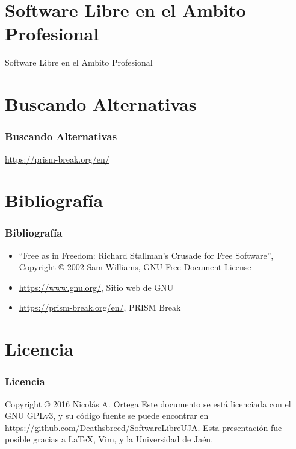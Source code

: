 \documentclass[xetex]{beamer}
\begin{document}

\section{Software Libre en el Ambito Profesional}
\begin{frame}
    \centering \Huge Software Libre en el Ambito Profesional
\end{frame}


\section{Buscando Alternativas}
\begin{frame}
    \frametitle{Buscando Alternativas}
    \centering \Large \url{https://prism-break.org/en/}
\end{frame}


\section{Bibliografía}
\begin{frame}[t]
    \frametitle{Bibliografía}
    \begin{itemize}
        \item ``Free as in Freedom: Richard Stallman's Crusade for Free Software'', Copyright \copyright{} 2002 Sam Williams, GNU Free Document License
        \item \url{https://www.gnu.org/}, Sitio web de GNU
        \item \url{https://prism-break.org/en/}, PRISM Break
    \end{itemize}
\end{frame}


\section{Licencia}
\begin{frame}
    \frametitle{Licencia}
    Copyright \copyright{} 2016 Nicolás A. Ortega
    \linebreak{}
    \linebreak{}
    Este documento se está licenciada con el GNU GPLv3, y su código fuente se puede encontrar en \url{https://github.com/Deathsbreed/SoftwareLibreUJA}.
    \linebreak{}
    \linebreak{}
    Esta presentación fue posible gracias a \LaTeX, Vim, y la Universidad de Jaén.
\end{frame}
\end{document}
